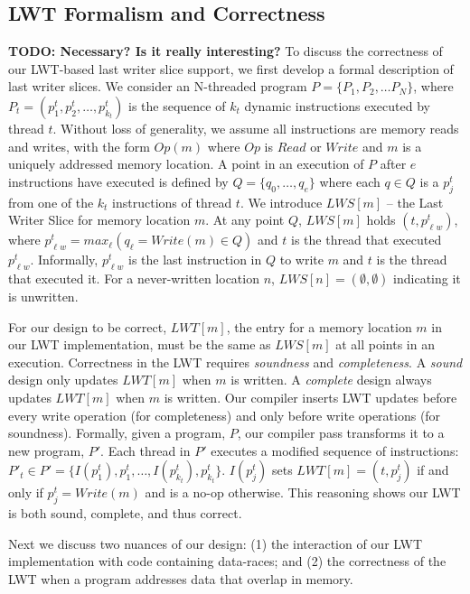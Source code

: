 \documentclass[preprint,9pt]{sigplanconf}
\newcommand{\lwt}{LWT\xspace}
\begin{document}
\subsection{\lwt Formalism and Correctness}
{\bf TODO: Necessary?  Is it really interesting?}
\label{sec:lwssoundness}
To discuss the correctness of our \lwt-based last writer slice support, we
first develop a formal description of last writer slices.  We consider an
N-threaded program $P = \{P_1, P_2, \ldots P_N\}$, where $P_t = (p^{t}_{1},
p^{t}_{2}, \ldots, p^{t}_{k_{t}})$ is the sequence of $k_{t}$ dynamic
instructions executed by thread $t$.  Without loss of generality, we assume all
instructions are memory reads and writes, with the form $Op(m)$ where $Op$ is
$Read$ or $Write$ and $m$ is a uniquely addressed memory location.
A point in an execution of $P$ after $e$ instructions have
executed is defined by $Q = \{q_{0}, \ldots, q_{e}\}$ where each $q \in Q$ is a
$p^{t}_{j}$ from one of the $k_t$ instructions of thread $t$.  We introduce
$LWS[m]$ -- the Last Writer Slice for memory location $m$.   At any point $Q$,
$LWS[m]$ holds $(t,p^{t}_{\ell w})$, where $p^{t}_{\ell w} = max_{\ell}( 
q_{\ell} = Write(m) \in Q)$ and $t$ is the thread that
executed $p^{t}_{\ell w}$. Informally, $p^{t}_{\ell w}$ is the last instruction
in $Q$ to write $m$ and $t$ is the thread that executed it.  For a
never-written location $n$, $LWS[n] = (\emptyset,\emptyset)$ indicating it is
unwritten.

For our design to be correct, $LWT[m]$, the entry for a memory location $m$ in
our \lwt implementation, must be the same as $LWS[m]$ at all points in an
execution.  Correctness in the \lwt requires {\em soundness} and {\em
completeness}.  A {\em sound} design only updates $LWT[m]$ when $m$ is written.
A {\em complete} design always updates $LWT[m]$ when $m$ is written.  Our
compiler inserts \lwt updates before every write operation (for completeness)
and only before write operations (for soundness).  Formally, given a program,
$P$, our compiler pass transforms it to a new program, $P'$.  Each thread in
$P'$ executes a modified sequence of instructions: $P'_{t} \in P' = \{
I(p^{t}_{1}), p^{t}_{1}, \ldots, I(p^{t}_{k_{t}}), p^{t}_{k_{t}} \}$.
$I(p^{t}_{j})$ sets $LWT[m] = (t,p^{t}_{j})$ if and only if $p^{t}_{j} =
Write(m)$ and is a no-op otherwise.  This reasoning shows our \lwt is both
sound, complete, and thus correct.

Next we discuss two nuances of our design: (1) the interaction of our \lwt
implementation with code containing data-races; and (2) the correctness of the
\lwt when a program addresses data that overlap in memory. 
\end{document}
